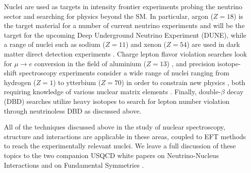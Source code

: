 Nuclei are used as targets in intensity frontier experiments probing the neutrino sector and searching for physics beyond the SM. In particular, argon ($Z=18$) is the target material for a number of current neutrino experiments and will be the target for the upcoming Deep Underground Neutrino Experiment (DUNE), while a range of nuclei such as sodium ($Z=11$) and  xenon ($Z=54$) are used in dark matter direct detection experiments \cite{Undagoitia:2015gya}. Charge lepton flavor violation searches look for $\mu\to e$ conversion in the field of aluminium ($Z=13$) \cite{Albrecht:2013wet}, and precision isotope-shift spectroscopy experiments consider a wide range of nuclei ranging from hydrogen ($Z=1$) to ytterbium ($Z=70$) in  order to constrain new physics \cite{Delaunay:2016brc,Delaunay:2017dku}, both requiring knowledge of various nuclear matrix elements \cite{Chang:2017eiq}. Finally, double-$\beta$ decay (DBD) searches utilize heavy isotopes to search for lepton number violation through neutrinoless DBD \cite{DellOro:2016tmg,Engel:2016xgb} as discussed above.

All of the techniques discussed above in the study of nuclear spectroscopy, structure and interactions are applicable in these areas, coupled to EFT methods to reach the experimentally relevant nuclei. We leave a full discussion of these topics to the two companion USQCD white papers on Neutrino-Nucleus Interactions \cite{wpneutrino}and on Fundamental Symmetries \cite{wpfund}.



